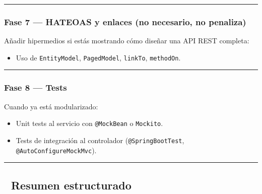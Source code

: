 \documentclass[
]{article}
\providecommand{\tightlist}{%
  \setlength{\itemsep}{0pt}\setlength{\parskip}{0pt}}
\begin{document}
\begin{center}\rule{0.5\linewidth}{0.5pt}\end{center}

\subsubsection{\texorpdfstring{\textbf{Fase 7 --- HATEOAS y enlaces} (no
necesario, no
penaliza)}{Fase 7 --- HATEOAS y enlaces (no necesario, no penaliza)}}\label{fase-7-hateoas-y-enlaces-no-necesario-no-penaliza}

Añadir hipermedios si estás mostrando cómo diseñar una API REST
completa:

\begin{itemize}
\tightlist
\item
  Uso de \texttt{EntityModel}, \texttt{PagedModel}, \texttt{linkTo},
  \texttt{methodOn}.
\end{itemize}

\begin{center}\rule{0.5\linewidth}{0.5pt}\end{center}

\subsubsection{\texorpdfstring{\textbf{Fase 8 ---
Tests}}{Fase 8 --- Tests}}\label{fase-8-tests}

Cuando ya está modularizado:

\begin{itemize}
\tightlist
\item
  Unit tests al servicio con \texttt{@MockBean} o \texttt{Mockito}.
\item
  Tests de integración al controlador (\texttt{@SpringBootTest},
  \texttt{@AutoConfigureMockMvc}).
\end{itemize}

\begin{center}\rule{0.5\linewidth}{0.5pt}\end{center}

\subsection{\texorpdfstring{🧠 \textbf{Resumen
estructurado}}{🧠 Resumen estructurado}}\label{resumen-estructurado}
\end{document}
